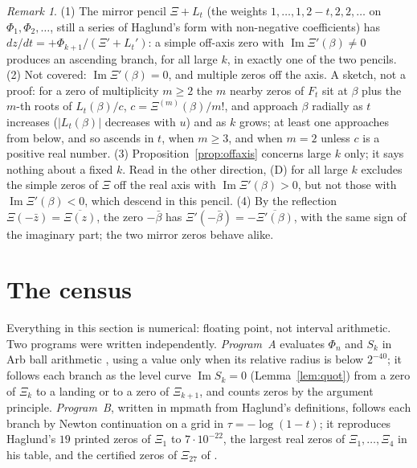 \documentclass[11pt]{article}
\theoremstyle{plain}
\theoremstyle{definition}
\theoremstyle{remark}
\newtheorem{remark}[theorem]{Remark}
\newcommand{\im}{\operatorname{Im}}
\begin{document}
\begin{remark}\label{rem:offaxis}
(1) The mirror pencil $\Xi + L_t$ (the weights $1, \ldots, 1, 2 - t, 2, 2,
\ldots$ on $\Phi_1, \Phi_2, \ldots$, still a series of Haglund's form
\cite[(53)]{Hag} with non-negative coefficients) has
$dz/dt = +\Phi_{k+1}/(\Xi' + L_t')$: a simple off-axis zero with
$\im\Xi'(\beta) \ne 0$ produces an ascending branch, for all large $k$, in
exactly one of the two pencils.
(2) Not covered: $\im\Xi'(\beta) = 0$, and multiple zeros off the axis. A
sketch, not a proof: for a zero of multiplicity $m \ge 2$ the $m$ nearby zeros
of $F_t$ sit at $\beta$ plus the $m$-th roots of $L_t(\beta)/c$,
$c = \Xi^{(m)}(\beta)/m!$, and approach $\beta$ radially as $t$ increases
($|L_t(\beta)|$ decreases with $u$) and as $k$ grows; at least one approaches
from below, and so ascends in $t$, when $m \ge 3$, and when $m = 2$ unless $c$
is a positive real number.
(3) Proposition~\ref{prop:offaxis} concerns large $k$ only; it says nothing
about a fixed $k$. Read in the other direction, (D) for all large $k$ excludes
the simple zeros of $\Xi$ off the real axis with $\im\Xi'(\beta) > 0$, but
not those with $\im\Xi'(\beta) < 0$, which descend in this pencil.
(4) By the reflection $\Xi(-\bar z) = \overline{\Xi(z)}$, the zero
$-\bar\beta$ has $\Xi'(-\bar\beta) = -\overline{\Xi'(\beta)}$, with the
same sign of the imaginary part; the two mirror zeros behave alike.
\end{remark}

\section{The census}\label{sec:census}

Everything in this section is numerical: floating point, not interval
arithmetic. Two programs were written independently. \emph{Program~A} evaluates
$\Phi_n$ and $S_k$ in Arb ball arithmetic \cite{Arb}, using a value
only when its relative radius is below $2^{-40}$; it follows each branch as the
level curve $\im S_k = 0$ (Lemma~\ref{lem:quot}) from a zero of $\Xi_k$ to a
landing or to a zero of $\Xi_{k+1}$, and counts zeros by the argument
principle. \emph{Program~B}, written in mpmath \cite{mpmath} from Haglund's
definitions, follows each branch by Newton
continuation on a grid in $\tau = -\log(1 - t)$; it reproduces Haglund's $19$
printed zeros of $\Xi_1$ to $7\cdot10^{-22}$, the largest real zeros of
$\Xi_1, \ldots, \Xi_4$ in his table, and the certified zeros of $\Xi_{27}$ of
\cite{Tya}.
\end{document}

